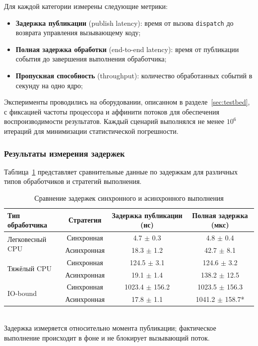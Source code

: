 Для каждой категории измерены следующие метрики:
\begin{itemize}
    \item \textbf{Задержка публикации} (publish latency): время от вызова \texttt{dispatch} до возврата управления вызывающему коду;
    \item \textbf{Полная задержка обработки} (end-to-end latency): время от публикации события до завершения выполнения обработчика;
    \item \textbf{Пропускная способность} (throughput): количество обработанных событий в секунду на одно ядро;
\end{itemize}

Эксперименты проводились на оборудовании, описанном в разделе~\ref{sec:testbed}, с фиксацией частоты процессора и аффинити потоков для обеспечения воспроизводимости результатов. Каждый сценарий выполнялся не менее $10^6$ итераций для минимизации статистической погрешности.

\subsubsection{Результаты измерения задержек}

Таблица~\ref{tab:latency_comparison} представляет сравнительные данные по задержкам для различных типов обработчиков и стратегий выполнения.

\begin{table}[H]
\centering
\footnotesize
\caption{Сравнение задержек синхронного и асинхронного выполнения}
\label{tab:latency_comparison}
\begin{tabular}{lccc}
\toprule
\textbf{Тип обработчика} & \textbf{Стратегия} & \textbf{Задержка публикации (нс)} & \textbf{Полная задержка (мкс)} \\
\midrule
\multirow{2}{*}{Легковесный CPU}
    & Синхронная & 4.7 $\pm$ 0.3 & 4.8 $\pm$ 0.4 \\
    & Асинхронная & 18.3 $\pm$ 1.2 & 42.7 $\pm$ 8.1 \\
\midrule
\multirow{2}{*}{Тяжёлый CPU}
    & Синхронная & 124.5 $\pm$ 3.1 & 124.6 $\pm$ 3.2 \\
    & Асинхронная & 19.1 $\pm$ 1.4 & 138.2 $\pm$ 12.5 \\
\midrule
\multirow{2}{*}{IO-bound}
    & Синхронная & 1023.4 $\pm$ 156.2 & 1023.5 $\pm$ 156.3 \\
    & Асинхронная & 17.8 $\pm$ 1.1 & 1041.2 $\pm$ 158.7* \\
\bottomrule
\end{tabular}
\smallskip\\
\footnotesize * Задержка измеряется относительно момента публикации; фактическое выполнение происходит в фоне и не блокирует вызывающий поток.
\end{table}

